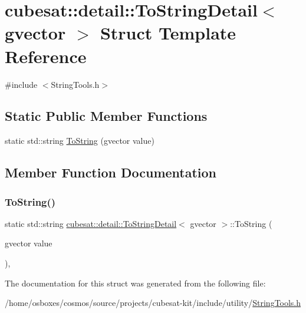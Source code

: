 \hypertarget{structcubesat_1_1detail_1_1ToStringDetail_3_01gvector_01_4}{}\section{cubesat\+:\+:detail\+:\+:To\+String\+Detail$<$ gvector $>$ Struct Template Reference}
\label{structcubesat_1_1detail_1_1ToStringDetail_3_01gvector_01_4}


{\ttfamily \#include $<$String\+Tools.\+h$>$}

\subsection*{Static Public Member Functions}
\begin{DoxyCompactItemize}
\item 
static std\+::string \hyperlink{structcubesat_1_1detail_1_1ToStringDetail_3_01gvector_01_4_a38d11514e20358477129f73f1e27c1da}{To\+String} (gvector value)
\end{DoxyCompactItemize}


\subsection{Member Function Documentation}
\mbox{\label{structcubesat_1_1detail_1_1ToStringDetail_3_01gvector_01_4_a38d11514e20358477129f73f1e27c1da}} 
\subsubsection{\texorpdfstring{To\+String()}{ToString()}}
{\footnotesize\ttfamily static std\+::string \hyperlink{structcubesat_1_1detail_1_1ToStringDetail}{cubesat\+::detail\+::\+To\+String\+Detail}$<$ gvector $>$\+::To\+String (\begin{DoxyParamCaption}\item[{gvector}]{value }\end{DoxyParamCaption})\hspace{0.3cm}{\ttfamily [inline]}, {\ttfamily [static]}}



The documentation for this struct was generated from the following file\+:\begin{DoxyCompactItemize}
\item 
/home/osboxes/cosmos/source/projects/cubesat-\/kit/include/utility/\hyperlink{StringTools_8h}{String\+Tools.\+h}\end{DoxyCompactItemize}
